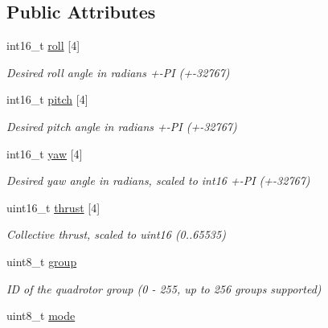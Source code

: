 \subsection*{Public Attributes}
\begin{DoxyCompactItemize}
\item 
int16\+\_\+t \hyperlink{struct____mavlink__set__quad__swarm__led__roll__pitch__yaw__thrust__t_a568ed43eb19616cf1d44d62103b02467}{roll} \mbox{[}4\mbox{]}
\begin{DoxyCompactList}\small\item\em Desired roll angle in radians +-\/\+P\+I (+-\/32767) \end{DoxyCompactList}\item 
int16\+\_\+t \hyperlink{struct____mavlink__set__quad__swarm__led__roll__pitch__yaw__thrust__t_ab96a6b36997461b18bf2bcb019ae72d8}{pitch} \mbox{[}4\mbox{]}
\begin{DoxyCompactList}\small\item\em Desired pitch angle in radians +-\/\+P\+I (+-\/32767) \end{DoxyCompactList}\item 
int16\+\_\+t \hyperlink{struct____mavlink__set__quad__swarm__led__roll__pitch__yaw__thrust__t_af47361a27fa441a864a6dfe0358af88d}{yaw} \mbox{[}4\mbox{]}
\begin{DoxyCompactList}\small\item\em Desired yaw angle in radians, scaled to int16 +-\/\+P\+I (+-\/32767) \end{DoxyCompactList}\item 
uint16\+\_\+t \hyperlink{struct____mavlink__set__quad__swarm__led__roll__pitch__yaw__thrust__t_a40bcd2646381b83473b10aad2037cfca}{thrust} \mbox{[}4\mbox{]}
\begin{DoxyCompactList}\small\item\em Collective thrust, scaled to uint16 (0..65535) \end{DoxyCompactList}\item 
\hypertarget{struct____mavlink__set__quad__swarm__led__roll__pitch__yaw__thrust__t_a387adc60138320063388f25ee4272c61}{uint8\+\_\+t \hyperlink{struct____mavlink__set__quad__swarm__led__roll__pitch__yaw__thrust__t_a387adc60138320063388f25ee4272c61}{group}}\label{struct____mavlink__set__quad__swarm__led__roll__pitch__yaw__thrust__t_a387adc60138320063388f25ee4272c61}

\begin{DoxyCompactList}\small\item\em I\+D of the quadrotor group (0 -\/ 255, up to 256 groups supported) \end{DoxyCompactList}\item 
\hypertarget{struct____mavlink__set__quad__swarm__led__roll__pitch__yaw__thrust__t_ac8dd7ef2a6d82c612c439624393b8fa3}{uint8\+\_\+t \hyperlink{struct____mavlink__set__quad__swarm__led__roll__pitch__yaw__thrust__t_ac8dd7ef2a6d82c612c439624393b8fa3}{mode}}\label{struct____mavlink__set__quad__swarm__led__roll__pitch__yaw__thrust__t_ac8dd7ef2a6d82c612c439624393b8fa3}


\end{DoxyCompactItemize}
